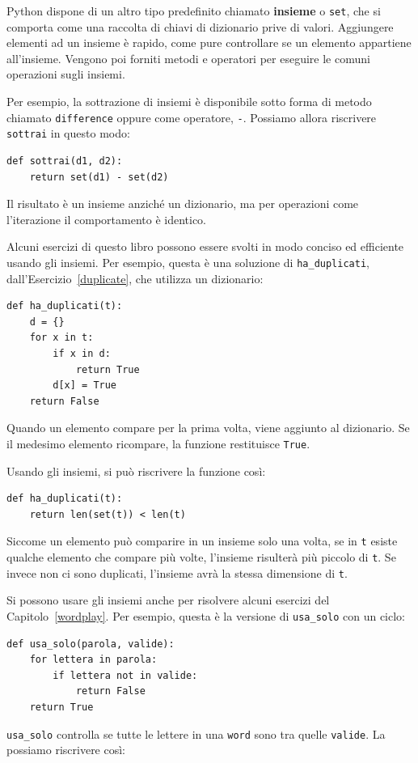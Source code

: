 \documentclass[10pt]{book}
\begin{document}
Python dispone di un altro tipo predefinito chiamato {\bf insieme} o {\tt set}, che si comporta come una raccolta di chiavi di dizionario prive di valori. Aggiungere elementi ad un insieme è rapido, come pure controllare se un elemento appartiene all'insieme. Vengono poi forniti metodi e operatori per eseguire le comuni operazioni sugli insiemi.

Per esempio, la sottrazione di insiemi è disponibile sotto forma di metodo chiamato {\tt difference} oppure come operatore, {\tt -}.  Possiamo allora riscrivere {\tt sottrai} in questo modo:

\begin{verbatim}
def sottrai(d1, d2):
    return set(d1) - set(d2)
\end{verbatim}
%
Il risultato è un insieme anziché un dizionario, ma per operazioni come l'iterazione il comportamento è identico. 

Alcuni esercizi di questo libro possono essere svolti in modo conciso ed efficiente usando gli insiemi.  Per esempio, questa è una soluzione di
\verb"ha_duplicati", dall'Esercizio~\ref{duplicate}, che utilizza un dizionario:

\begin{verbatim}
def ha_duplicati(t):
    d = {}
    for x in t:
        if x in d:
            return True
        d[x] = True
    return False
\end{verbatim}

Quando un elemento compare per la prima volta, viene aggiunto al dizionario. Se il medesimo elemento ricompare, la funzione restituisce {\tt True}.

Usando gli insiemi, si può riscrivere la funzione così:

\begin{verbatim}
def ha_duplicati(t):
    return len(set(t)) < len(t)
\end{verbatim}
%
Siccome un elemento può comparire in un insieme solo una volta, se in {\tt t} esiste qualche elemento che compare più volte, l'insieme risulterà più piccolo di {\tt t}. Se invece non ci sono duplicati, l'insieme avrà la stessa dimensione di {\tt t}.

Si possono usare gli insiemi anche per risolvere alcuni esercizi del Capitolo~\ref{wordplay}.  Per esempio, questa è la versione di
\verb"usa_solo" con un ciclo:

\begin{verbatim}
def usa_solo(parola, valide):
    for lettera in parola: 
        if lettera not in valide:
            return False
    return True
\end{verbatim}
%
\verb"usa_solo" controlla se tutte le lettere in una {\tt word} sono tra quelle {\tt valide}.  La possiamo riscrivere così:
\end{document}
